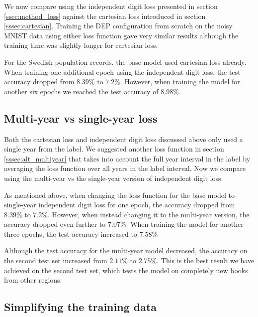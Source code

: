 We now compare using the independent digit loss presented in section \ref{ssec:method_loss} against the cartesian loss introduced in section \ref{sssec:cartesian}.
Training the DEP configuration from scratch on the noisy MNIST data using either loss function gave very similar results although the training time was slightly longer for cartesian loss.

For the Swedish population records, the base model used cartesian loss already. When training one additional epoch using the independent digit loss, the test accuracy dropped from $8.39\%$ to $7.2\%$. However, when training the model for another six epochs we reached the test accuracy of $8.98\%$.

\subsection{Multi-year vs single-year loss} \label{ssec:result_multiyear}

Both the cartesian loss and independent digit loss discussed above only used a single year from the label. We suggested another loss function in section \ref{sssec:alt_multiyear} that takes into account the full year interval in the label by averaging the loss function over all years in the label interval. Now we compare using the multi-year vs the single-year version of independent digit loss.

As mentioned above, when changing the loss function for the base model to single-year independent digit loss for one epoch, the accuracy dropped from $8.39\%$ to $7.2\%$. However, when instead changing it to the multi-year version, the accuracy dropped even further to $7.07\%$. When training the model for another three epochs, the test accuracy increased to $7.58\%$

Although the test accuracy for the multi-year model decreased, the accuracy on the second test set increased from $2.11\%$ to $2.75\%$. This is the best result we have achieved on the second test set, which tests the model on completely new books from other regions.


\subsection{Simplifying the training data}

